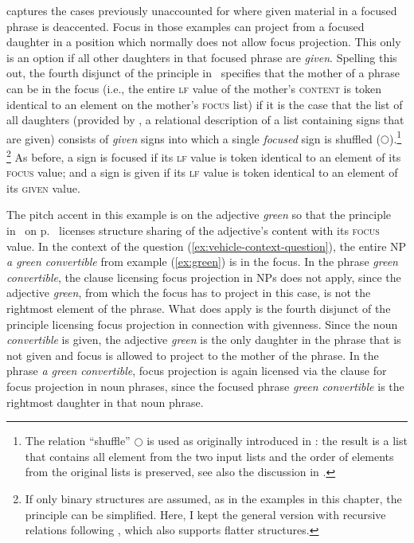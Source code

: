 \documentclass[output=paper
	        ,collection
	        ,collectionchapter
 	        ,biblatex
                ,babelshorthands
                ,newtxmath
                ,draftmode
                ,colorlinks, citecolor=brown
]{langscibook}
\begin{document}
captures the cases previously unaccounted for where given material in a
focused phrase is deaccented. Focus in those examples can project from a
focused daughter in a position which normally does not allow focus
projection.  This only is an option if all other daughters in that
focused phrase are \emph{given}.  Spelling this out, the fourth
disjunct of the principle in~
specifies that the mother of a phrase can be in the focus (i.e., the
entire \textsc{lf} value of the mother's \textsc{content} is token
identical to an element on the mother's \textsc{focus} list) if it is
the case that the list of all daughters (provided by , a relational description of a list containing signs that are given)
consists of \textit{given} signs into which a single \textit{focused}
sign is shuffled ($\bigcirc$).\footnote{The relation ``shuffle'' $\bigcirc$ is used as originally introduced in  \cite{Reape94}: the result is a list that contains all element from the two input lists and the order of elements from the original lists is preserved, see also the discussion in .}  \footnote{If only binary structures are
  assumed, as in the examples in this chapter, the principle can be
  simplified. Here, I kept the general version with recursive
  relations following \citet{dKM2003a}, which also
  supports flatter structures.} As before, a sign is focused if its
\textsc{lf} value is token identical to an element of its
\textsc{focus} value; and a sign is given if its \textsc{lf} value is
token identical to an element of its \textsc{given} value.

The pitch accent in this example is on the adjective \textit{green} so
that the principle in~ on p.~\pageref{fig:words} licenses structure
sharing of the adjective's content with its \textsc{focus} value. In
the context of the question (\ref{ex:vehicle-context-question}), the
entire NP \textit{a green convertible} from example (\ref{ex:green}) is
in the focus. In the phrase \textit{green convertible}, the clause
licensing focus projection in NPs does not apply, since the adjective
\textit{green}, from which the focus has to project in this case, is
not the rightmost element of the phrase.  What does apply is the
fourth disjunct of the principle licensing focus projection in
connection with givenness. Since the noun \textit{convertible} is
given, the adjective \textit{green} is the only daughter in the phrase
that is not given and focus is allowed to project to the mother of the
phrase. In the phrase \textit{a green convertible}, focus projection is
again licensed via the clause for focus projection in noun phrases,
since the focused phrase \textit{green convertible} is the rightmost
daughter in that noun phrase.
\end{document}
